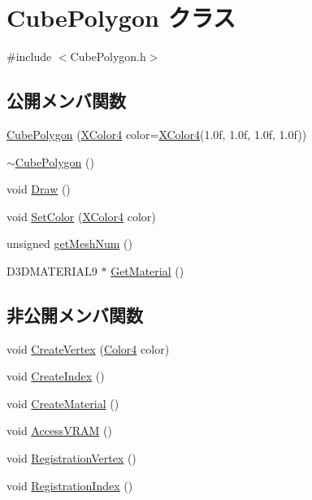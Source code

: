 \hypertarget{class_cube_polygon}{}\section{Cube\+Polygon クラス}
\label{class_cube_polygon}


{\ttfamily \#include $<$Cube\+Polygon.\+h$>$}

\subsection*{公開メンバ関数}
\begin{DoxyCompactItemize}
\item 
\mbox{\hyperlink{class_cube_polygon_aee418cf078227778280dafb22d7586bb}{Cube\+Polygon}} (\mbox{\hyperlink{_vector3_d_8h_a680c30c4a07d86fe763c7e01169cd6cc}{X\+Color4}} color=\mbox{\hyperlink{_vector3_d_8h_a680c30c4a07d86fe763c7e01169cd6cc}{X\+Color4}}(1.\+0f, 1.\+0f, 1.\+0f, 1.\+0f))
\item 
\mbox{\hyperlink{class_cube_polygon_ae6cd078c65ba32e8da56b8f7d5e92d2a}{$\sim$\+Cube\+Polygon}} ()
\item 
void \mbox{\hyperlink{class_cube_polygon_ac9003cd00eea402f2b6c5fb5a77feae2}{Draw}} ()
\item 
void \mbox{\hyperlink{class_cube_polygon_acf6a30c30c22dd887ed570db6cbe285d}{Set\+Color}} (\mbox{\hyperlink{_vector3_d_8h_a680c30c4a07d86fe763c7e01169cd6cc}{X\+Color4}} color)
\item 
unsigned \mbox{\hyperlink{class_cube_polygon_a50970957b530b7089487799210b14903}{get\+Mesh\+Num}} ()
\item 
D3\+D\+M\+A\+T\+E\+R\+I\+A\+L9 $\ast$ \mbox{\hyperlink{class_cube_polygon_a6bd49d47a58c9c89a1ddaee37f7f4d22}{Get\+Material}} ()
\end{DoxyCompactItemize}
\subsection*{非公開メンバ関数}
\begin{DoxyCompactItemize}
\item 
void \mbox{\hyperlink{class_cube_polygon_ae36048a1ae7b13b6bc8571231b372627}{Create\+Vertex}} (\mbox{\hyperlink{_vector3_d_8h_a9c2339f516cf07ce4753b8a99fab3791}{Color4}} color)
\item 
void \mbox{\hyperlink{class_cube_polygon_ade2e155c44798710b8e91ac84b02340f}{Create\+Index}} ()
\item 
void \mbox{\hyperlink{class_cube_polygon_abc3b69a3cb237dec28d0bba9229f0b8d}{Create\+Material}} ()
\item 
void \mbox{\hyperlink{class_cube_polygon_a715db255bf7ebd3c3aec2095d73b9399}{Access\+V\+R\+AM}} ()
\item 
void \mbox{\hyperlink{class_cube_polygon_adde345ed591e3e81abcffdcac5068f98}{Registration\+Vertex}} ()
\item 
void \mbox{\hyperlink{class_cube_polygon_a5a935712a3e3c1e12552aeedf2f409c1}{Registration\+Index}} ()
\end{DoxyCompactItemize}
